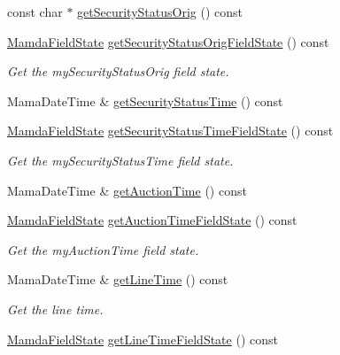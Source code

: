 \begin{CompactItemize}
const char $\ast$ \hyperlink{classWombat_1_1MamdaOrderImbalanceListener_ea12f359de6aa79408f26d36ea8db179}{get\-Security\-Status\-Orig} () const 
\item 
\hyperlink{namespaceWombat_93aac974f2ab713554fd12a1fa3b7d2a}{Mamda\-Field\-State} \hyperlink{classWombat_1_1MamdaOrderImbalanceListener_1748b68453c66e890d34f666d6525832}{get\-Security\-Status\-Orig\-Field\-State} () const 
\begin{CompactList}\small\item\em Get the my\-Security\-Status\-Orig field state. \item\end{CompactList}\item 
Mama\-Date\-Time \& \hyperlink{classWombat_1_1MamdaOrderImbalanceListener_1e72e1cbb405c48d7acab9ea19b3014e}{get\-Security\-Status\-Time} () const 
\item 
\hyperlink{namespaceWombat_93aac974f2ab713554fd12a1fa3b7d2a}{Mamda\-Field\-State} \hyperlink{classWombat_1_1MamdaOrderImbalanceListener_7588daaf6700cd13510c480612e19fe0}{get\-Security\-Status\-Time\-Field\-State} () const 
\begin{CompactList}\small\item\em Get the my\-Security\-Status\-Time field state. \item\end{CompactList}\item 
Mama\-Date\-Time \& \hyperlink{classWombat_1_1MamdaOrderImbalanceListener_ce6a5772582fd4c526fbce36f1edee13}{get\-Auction\-Time} () const 
\item 
\hyperlink{namespaceWombat_93aac974f2ab713554fd12a1fa3b7d2a}{Mamda\-Field\-State} \hyperlink{classWombat_1_1MamdaOrderImbalanceListener_34beab82ba1bcb31a0a67df3fd9fa4bd}{get\-Auction\-Time\-Field\-State} () const 
\begin{CompactList}\small\item\em Get the my\-Auction\-Time field state. \item\end{CompactList}\item 
Mama\-Date\-Time \& \hyperlink{classWombat_1_1MamdaOrderImbalanceListener_39ab83f80c21af82d0327dbb11a517d3}{get\-Line\-Time} () const 
\begin{CompactList}\small\item\em Get the line time. \item\end{CompactList}\item 
\hyperlink{namespaceWombat_93aac974f2ab713554fd12a1fa3b7d2a}{Mamda\-Field\-State} \hyperlink{classWombat_1_1MamdaOrderImbalanceListener_e5911efbbda1cb87fb25f7869a01a103}{get\-Line\-Time\-Field\-State} () const 

\end{CompactItemize}
